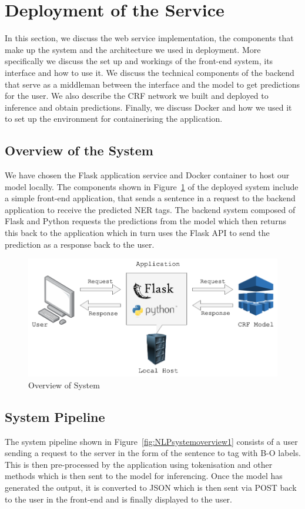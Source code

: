 \documentclass{surreydissertation}
\begin{document}
\section{Deployment of the Service}
\label{sec:deployment}
In this section, we discuss the web service implementation, the components that make up the system and the architecture we used in deployment. More specifically we discuss the set up and workings of the front-end system, its interface and how to use it. We discuss the technical components of the backend that serve as a middleman between the interface and the model to get predictions for the user. We also describe the CRF network we built and deployed to inference and obtain predictions. Finally, we discuss Docker and how we used it to set up the environment for containerising the application.

\subsection{Overview of the System}
\label{sec:system-overview}
We have chosen the Flask application service and Docker container to host our model locally. The components  shown in Figure~\ref{fig:NLPsystemoverview2} of the deployed system include a simple front-end application, that sends a sentence in a request to the backend application to receive the predicted NER tags. The backend system composed of Flask and Python requests the predictions from the model which then returns this back to the application which in turn uses the Flask API to send the prediction as a response back to the user.


\begin{figure}
    \centering
    \includegraphics[width=0.9\linewidth]{Figures/NLPsystemoverview2.png}
    \caption{Overview of System}
    \label{fig:NLPsystemoverview2}
 \end{figure}

\subsection{System Pipeline}
The system pipeline shown in Figure~\ref{fig:NLPsystemoverview1} consists of a user sending a request to the server in the form of the sentence to tag with B-O labels. This is then pre-processed by the application using tokenisation and other methods which is then sent to the model for inferencing. Once the model has generated the output, it is converted to JSON which is then sent via POST back to the user in the front-end and is finally displayed to the user.
\end{document}
